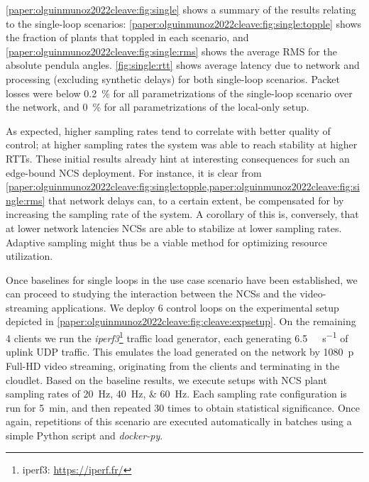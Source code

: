 \cref{paper:olguinmunoz2022cleave:fig:single} shows a summary of the results relating to the single-loop scenarios:
\cref{paper:olguinmunoz2022cleave:fig:single:topple} shows the fraction of plants that toppled in each scenario, and \cref{paper:olguinmunoz2022cleave:fig:single:rms} shows the average \gls{RMS} for the absolute pendula angles.
\cref{fig:single:rtt} shows average latency due to network and processing (excluding synthetic delays) for both single-loop scenarios.
Packet losses were below \SI{0.2}{\percent} for all parametrizations of the single-loop scenario over the network, and \SI{0}{\percent} for all parametrizations of the local-only setup.

As expected, higher sampling rates tend to correlate with better quality of control;
at higher sampling rates the system was able to reach stability at higher \glspl{RTT}.
These initial results already hint at interesting consequences for such an edge-bound \gls{NCS} deployment.
For instance, it is clear from \cref{paper:olguinmunoz2022cleave:fig:single:topple,paper:olguinmunoz2022cleave:fig:single:rms} that network delays can, to a certain extent, be compensated for by increasing the sampling rate of the system.
A corollary of this is, conversely, that at lower network latencies \glspl{NCS} are able to stabilize at lower sampling rates.
Adaptive sampling might thus be a viable method for optimizing resource utilization.

Once baselines for single loops in the use case scenario have been established, we can proceed to studying the interaction between the \glspl{NCS} and the video-streaming applications.
We deploy \num{6} control loops on the experimental setup depicted in \cref{paper:olguinmunoz2022cleave:fig:cleave:expsetup}.
On the remaining \num{4} clients we run the \emph{iperf3}\footnote{iperf3: \url{https://iperf.fr/}} traffic load generator, each generating \SI[per-mode=symbol]{6.5}{\mega\bit\per\second} of uplink \gls{UDP} traffic.
This emulates the load generated on the network by \SI{1080}{p} Full-HD video streaming, originating from the clients and terminating in the cloudlet.
Based on the baseline results, we execute setups with \gls{NCS} plant sampling rates of \SIlist{20;40;60}{\hertz}.
Each sampling rate configuration is run for \SI{5}{\minute}, and then repeated \num{30} times to obtain statistical significance.
Once again, repetitions of this scenario are executed automatically in batches using a simple Python script and \emph{docker-py}.

